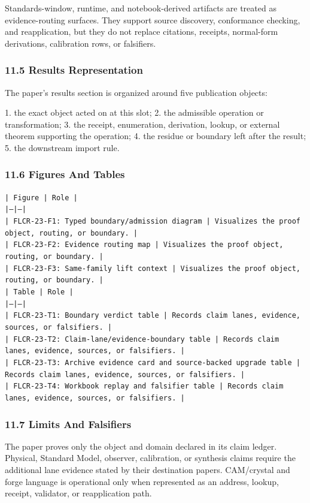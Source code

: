 \documentclass[11pt]{article}
\begin{document}
Standards-window, runtime, and notebook-derived artifacts are treated
as evidence-routing surfaces. They support source discovery, conformance
checking, and reapplication, but they do not replace citations, receipts,
normal-form derivations, calibration rows, or falsifiers.

\subsubsection*{11.5 Results Representation}

The paper's results section is organized around five publication objects:

1. the exact object acted on at this slot;
2. the admissible operation or transformation;
3. the receipt, enumeration, derivation, lookup, or external theorem supporting
   the operation;
4. the residue or boundary left after the result;
5. the downstream import rule.

\subsubsection*{11.6 Figures And Tables}

\noindent\texttt{| Figure | Role |}\\
\noindent\texttt{|---|---|}\\
\noindent\texttt{| FLCR-23-F1: Typed boundary/admission diagram | Visualizes the proof object, routing, or boundary. |}\\
\noindent\texttt{| FLCR-23-F2: Evidence routing map | Visualizes the proof object, routing, or boundary. |}\\
\noindent\texttt{| FLCR-23-F3: Same-family lift context | Visualizes the proof object, routing, or boundary. |}\\

\noindent\texttt{| Table | Role |}\\
\noindent\texttt{|---|---|}\\
\noindent\texttt{| FLCR-23-T1: Boundary verdict table | Records claim lanes, evidence, sources, or falsifiers. |}\\
\noindent\texttt{| FLCR-23-T2: Claim-lane/evidence-boundary table | Records claim lanes, evidence, sources, or falsifiers. |}\\
\noindent\texttt{| FLCR-23-T3: Archive evidence card and source-backed upgrade table | Records claim lanes, evidence, sources, or falsifiers. |}\\
\noindent\texttt{| FLCR-23-T4: Workbook replay and falsifier table | Records claim lanes, evidence, sources, or falsifiers. |}\\

\subsubsection*{11.7 Limits And Falsifiers}

The paper proves only the object and domain declared in its claim ledger.
Physical, Standard Model, observer, calibration, or synthesis claims require
the additional lane evidence stated by their destination papers. CAM/crystal
and forge language is operational only when represented as an address, lookup,
receipt, validator, or reapplication path.
\end{document}
